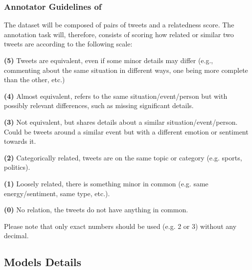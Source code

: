 \subsubsection{Annotator Guidelines of {\TweetSimilarity}}
\label{appendix:SuperTweetEval-annotation}

The dataset will be composed of pairs of tweets and a relatedness score. The annotation task will, therefore, consists of scoring how related or similar two tweets are according to the following scale:

\noindent \textbf{(5)} Tweets are equivalent, even if some minor details may differ (e.g., commenting about the same situation in different ways, one being more complete than the other, etc.)

\noindent \textbf{(4)} Almost equivalent, refers to the same situation/event/person but with possibly relevant differences, such as missing significant details.

\noindent \textbf{(3)} Not equivalent, but shares details about a similar situation/event/person. Could be tweets around a similar event but with a different emotion or sentiment towards it.

\noindent \textbf{(2)} Categorically related, tweets are on the same topic or category (e.g. sports, politics).

\noindent \textbf{(1)} Loosely related, there is something minor in common (e.g. same energy/sentiment, same type, etc.).

\noindent \textbf{(0)} No relation, the tweets do not have anything in common.

Please note that only exact numbers should be used (e.g. 2 or 3) without any decimal.

\subsection{Models Details}


